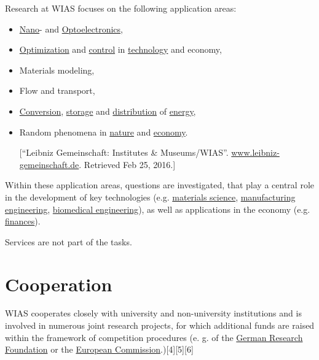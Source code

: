 \documentclass{book}
\numberwithin{equation}{section}
\begin{document}
%
Research at WIAS focuses on the following application areas:
\begin{itemize}
    \item \href{https://en.wikipedia.org/wiki/Nanoelectronics}{Nano}- and \href{https://en.wikipedia.org/wiki/Optoelectronics}{Optoelectronics},
    \item \href{https://en.wikipedia.org/wiki/Mathematical_optimization}{Optimization} and \href{https://en.wikipedia.org/wiki/Control_theory}{control} in \href{https://en.wikipedia.org/wiki/Technology}{technology} and economy,
    \item Materials modeling,
    \item Flow and transport,
    \item \href{https://en.wikipedia.org/wiki/Energy_transformation}{Conversion}, \href{https://en.wikipedia.org/wiki/Energy_storage}{storage} and \href{https://en.wikipedia.org/wiki/Electric_power_distribution}{distribution} of \href{https://en.wikipedia.org/wiki/Energy}{energy},
    \item Random phenomena in \href{https://en.wikipedia.org/wiki/Nature}{nature} and \href{https://en.wikipedia.org/wiki/Economy}{economy}.
    
    [``Leibniz Gemeinschaft: Institutes \& Museums/WIAS''. \url{www.leibniz-gemeinschaft.de}. Retrieved Feb 25, 2016.]
\end{itemize}
Within these application areas, questions are investigated, that play a central role in the development of key technologies (e.g. \href{https://en.wikipedia.org/wiki/Materials_science}{materials science}, \href{https://en.wikipedia.org/wiki/Manufacturing_engineering}{manufacturing engineering}, \href{https://en.wikipedia.org/wiki/Biomedical_engineering}{biomedical engineering}), as well as applications in the economy (e.g. \href{https://en.wikipedia.org/wiki/Finance}{finances}).

%
Services are not part of the tasks.

\section{Cooperation}
WIAS cooperates closely with university and non-university institutions and is involved in numerous joint research projects, for which additional funds are raised within the framework of competition procedures (e. g. of the \href{https://en.wikipedia.org/wiki/German_Research_Foundation}{German Research Foundation} or the \href{https://en.wikipedia.org/wiki/European_Commission}{European Commission}.)[4][5][6]
\end{document}
